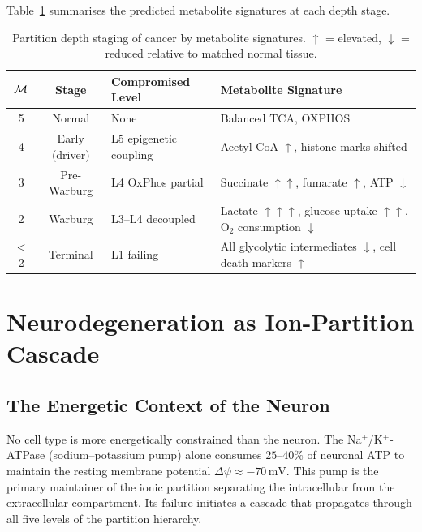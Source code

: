 Table~\ref{tab:cancer_biomarkers} summarises the predicted metabolite
signatures at each depth stage.

\begin{table}[htbp]
\centering
\caption{Partition depth staging of cancer by metabolite signatures.
         $\uparrow$ = elevated, $\downarrow$ = reduced relative to matched normal tissue.}
\label{tab:cancer_biomarkers}
\begin{tabularx}{\textwidth}{@{} c c X X @{}}
  \toprule
  $\mathcal{M}$ & Stage & Compromised Level & Metabolite Signature \\
  \midrule
  5 & Normal & None & Balanced TCA, OXPHOS \\
  4 & Early (driver) & L5 epigenetic coupling & Acetyl-CoA $\uparrow$, histone marks shifted \\
  3 & Pre-Warburg & L4 OxPhos partial & Succinate $\uparrow\uparrow$, fumarate $\uparrow$, ATP $\downarrow$ \\
  2 & Warburg & L3--L4 decoupled & Lactate $\uparrow\uparrow\uparrow$, glucose uptake $\uparrow\uparrow$, O$_2$ consumption $\downarrow$ \\
  $<$2 & Terminal & L1 failing & All glycolytic intermediates $\downarrow$, cell death markers $\uparrow$ \\
  \bottomrule
\end{tabularx}
\end{table}

\section{Neurodegeneration as Ion-Partition Cascade}
\label{sec:neurodegeneration}

\subsection{The Energetic Context of the Neuron}

No cell type is more energetically constrained than the neuron. The
Na$^+$/K$^+$-ATPase (sodium--potassium pump) alone consumes $25$--$40\%$
of neuronal ATP to maintain the resting membrane potential
$\Delta\psi \approx -70\,\mathrm{mV}$. This pump is the primary maintainer
of the ionic partition separating the intracellular from the extracellular
compartment. Its failure initiates a cascade that propagates through all five
levels of the partition hierarchy.

